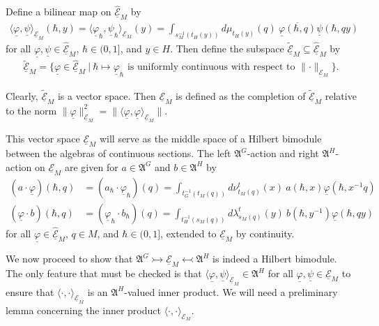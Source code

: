 \documentclass[sn-mathphys,Numbered]{sn-jnl}
\providecommand{\norm}[1]{\lVert#1\rVert}
\providecommand{\inner}[2]{\langle#1,#2\rangle}
\begin{document}
Define a bilinear map on $\widehat{\underline{\mathcal{E}}}_M$ by
\begin{align}
    \inner{\underline{\varphi}}{\underline{\psi}}_{\underline{\mathcal{E}}_M}(\hbar,y) = \inner{\underline{\varphi}_\hbar}{\underline{\psi}_\hbar}_{\mathcal{E}_M}(y) = \int_{s_M^{-1}(t_H(y))}d\mu_{t_H(y)}(q)\ \overline{\underline{\varphi}(\hbar,q)}\underline{\psi}(\hbar,qy)
\end{align}
for all $\underline{\varphi},\underline{\psi}\in \widehat{\underline{\mathcal{E}}}_M$, $\hbar\in (0,1]$, and $y\in H$.  Then define the subspace $\widetilde{\underline{\mathcal{E}}}_M\subseteq\widehat{\underline{\mathcal{E}}}_M$ by
\begin{align}
    \widetilde{\underline{\mathcal{E}}}_M = \Big\{\underline{\varphi}\in \widehat{\underline{\mathcal{E}}}_M\ \Big|\ \hbar\mapsto \underline{\varphi}_\hbar\text{ is uniformly continuous with respect to }\norm{\cdot}_{\mathcal{E}_M}\Big\}. 
\end{align}

\noindent Clearly, $\widetilde{\underline{\mathcal{E}}}_M$ is a vector space.  Then $\underline{\mathcal{E}}_M$ is defined as the completion of $\widetilde{\underline{\mathcal{E}}}_M$ relative to the norm $\norm{\underline{\varphi}}_{\underline{\mathcal{E}}_M}^2 = \norm{\inner{\underline{\varphi}}{\underline{\varphi}}_{\underline{\mathcal{E}}_M}}$.

This vector space $\underline{\mathcal{E}}_M$ will serve as the middle space of a Hilbert bimodule between the algebras of continuous sections.  The left $\mathfrak{A}^G$-action and right $\mathfrak{A}^H$-action on $\underline{\mathcal{E}}_M$ are given for $a\in\mathfrak{A}^G$ and $b\in\mathfrak{A}^H$ by
\begin{align}
    (a\cdot \underline{\varphi})(\hbar,q) &= (a_\hbar\cdot \underline{\varphi}_\hbar)(q) = \int_{t_G^{-1}(t_M(q))} d\nu^t_{t_M(q)}(x)\ a(\hbar,x)\underline{\varphi}(\hbar,x^{-1}q)\\
    (\underline{\varphi}\cdot b)(\hbar,q) &= (\underline{\varphi}_\hbar\cdot b_\hbar)(q) = \int_{t_H^{-1}(s_M(q))} d\lambda^t_{s_M(q)}(y)\ b(\hbar,y^{-1})\underline{\varphi}(\hbar,qy)
\end{align}
for all $\underline{\varphi}\in \widehat{\underline{\mathcal{E}}}_M$, $q\in M$, and $\hbar\in (0,1]$, extended to $\underline{\mathcal{E}}_M$ by continuity.

We now proceed to show that $\mathfrak{A}^G\rightarrowtail \underline{\mathcal{E}}_M\leftarrowtail \mathfrak{A}^H$ is indeed a Hilbert bimodule.  The only feature that must be checked is that $\inner{\underline{\varphi}}{\underline{\psi}}_{\underline{\mathcal{E}}_M}\in \mathfrak{A}^H$ for all $\underline{\varphi},\underline{\psi}\in \underline{\mathcal{E}}_M$ to ensure that $\inner{\cdot}{\cdot}_{\underline{\mathcal{E}}_M}$ is an $\mathfrak{A}^H$-valued inner product.  We will need a preliminary lemma concerning the inner product $\inner{\cdot}{\cdot}_{\mathcal{E}_M}$.\bigskip
\end{document}
